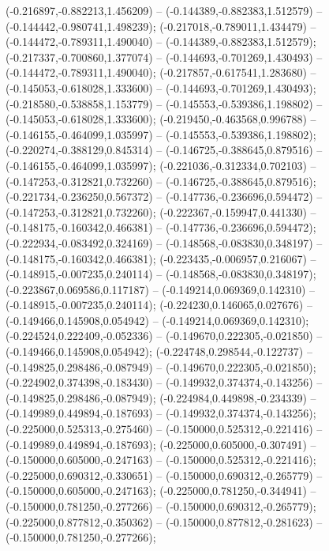  (-0.216897,-0.882213,1.456209) -- (-0.144389,-0.882383,1.512579) -- (-0.144442,-0.980741,1.498239);
 (-0.217018,-0.789011,1.434479) -- (-0.144472,-0.789311,1.490040) -- (-0.144389,-0.882383,1.512579);
 (-0.217337,-0.700860,1.377074) -- (-0.144693,-0.701269,1.430493) -- (-0.144472,-0.789311,1.490040);
 (-0.217857,-0.617541,1.283680) -- (-0.145053,-0.618028,1.333600) -- (-0.144693,-0.701269,1.430493);
 (-0.218580,-0.538858,1.153779) -- (-0.145553,-0.539386,1.198802) -- (-0.145053,-0.618028,1.333600);
 (-0.219450,-0.463568,0.996788) -- (-0.146155,-0.464099,1.035997) -- (-0.145553,-0.539386,1.198802);
 (-0.220274,-0.388129,0.845314) -- (-0.146725,-0.388645,0.879516) -- (-0.146155,-0.464099,1.035997);
 (-0.221036,-0.312334,0.702103) -- (-0.147253,-0.312821,0.732260) -- (-0.146725,-0.388645,0.879516);
 (-0.221734,-0.236250,0.567372) -- (-0.147736,-0.236696,0.594472) -- (-0.147253,-0.312821,0.732260);
 (-0.222367,-0.159947,0.441330) -- (-0.148175,-0.160342,0.466381) -- (-0.147736,-0.236696,0.594472);
 (-0.222934,-0.083492,0.324169) -- (-0.148568,-0.083830,0.348197) -- (-0.148175,-0.160342,0.466381);
 (-0.223435,-0.006957,0.216067) -- (-0.148915,-0.007235,0.240114) -- (-0.148568,-0.083830,0.348197);
 (-0.223867,0.069586,0.117187) -- (-0.149214,0.069369,0.142310) -- (-0.148915,-0.007235,0.240114);
 (-0.224230,0.146065,0.027676) -- (-0.149466,0.145908,0.054942) -- (-0.149214,0.069369,0.142310);
 (-0.224524,0.222409,-0.052336) -- (-0.149670,0.222305,-0.021850) -- (-0.149466,0.145908,0.054942);
 (-0.224748,0.298544,-0.122737) -- (-0.149825,0.298486,-0.087949) -- (-0.149670,0.222305,-0.021850);
 (-0.224902,0.374398,-0.183430) -- (-0.149932,0.374374,-0.143256) -- (-0.149825,0.298486,-0.087949);
 (-0.224984,0.449898,-0.234339) -- (-0.149989,0.449894,-0.187693) -- (-0.149932,0.374374,-0.143256);
 (-0.225000,0.525313,-0.275460) -- (-0.150000,0.525312,-0.221416) -- (-0.149989,0.449894,-0.187693);
 (-0.225000,0.605000,-0.307491) -- (-0.150000,0.605000,-0.247163) -- (-0.150000,0.525312,-0.221416);
 (-0.225000,0.690312,-0.330651) -- (-0.150000,0.690312,-0.265779) -- (-0.150000,0.605000,-0.247163);
 (-0.225000,0.781250,-0.344941) -- (-0.150000,0.781250,-0.277266) -- (-0.150000,0.690312,-0.265779);
 (-0.225000,0.877812,-0.350362) -- (-0.150000,0.877812,-0.281623) -- (-0.150000,0.781250,-0.277266);
